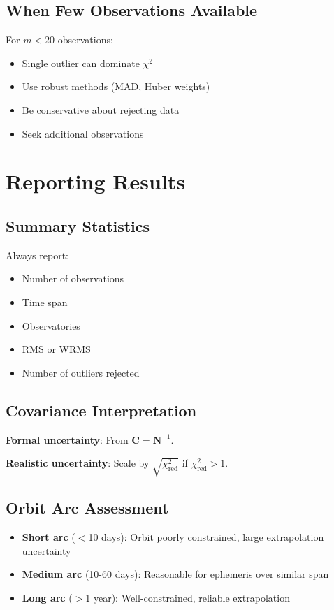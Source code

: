 \subsection{When Few Observations Available}

For $m < 20$ observations:
\begin{itemize}
    \item Single outlier can dominate $\chi^2$
    \item Use robust methods (MAD, Huber weights)
    \item Be conservative about rejecting data
    \item Seek additional observations
\end{itemize}

\section{Reporting Results}

\subsection{Summary Statistics}

Always report:
\begin{itemize}
    \item Number of observations
    \item Time span
    \item Observatories
    \item RMS or WRMS
    \item Number of outliers rejected
\end{itemize}

\subsection{Covariance Interpretation}

\textbf{Formal uncertainty}: From $\mathbf{C} = \mathbf{N}^{-1}$.

\textbf{Realistic uncertainty}: Scale by $\sqrt{\chi^2_{\text{red}}}$ if $\chi^2_{\text{red}} > 1$.

\subsection{Orbit Arc Assessment}

\begin{itemize}
    \item \textbf{Short arc} ($<$10 days): Orbit poorly constrained, large extrapolation uncertainty
    \item \textbf{Medium arc} (10-60 days): Reasonable for ephemeris over similar span
    \item \textbf{Long arc} ($>$1 year): Well-constrained, reliable extrapolation
\end{itemize}

